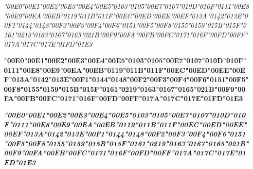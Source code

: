 {\itshape 
	\textsc{\char"00E0\gs \char"00E1\gs \char"00E2\gs \char"00E3\gs \char"00E4\gs \char"00E5\gs \char"0103\gs \char"0105\gs \char"00E7\gs \char"0107\gs \char"010D\gs \char"010F\gs \char"0111\gs \char"00E8\gs \char"00E9\gs \char"00EA\gs \char"00EB\gs \char"0119\gs \char"011B\gs \char"011F\gs \char"00EC\gs \char"00ED\gs \char"00EE\gs \char"00EF\gs \char"013A\gs \char"0142\gs \char"013E\gs \char"00F1\gs \char"0144\gs \char"0148\gs \char"00F2\gs \char"00F3\gs \char"00F4\gs \char"00F6\gs \char"0151\gs \char"00F5\gs \char"00F8\gs \char"0155\gs \char"0159\gs \char"015B\gs \char"015F\gs \char"0161\gs \char"0219\gs \char"0163\gs \char"0167\gs \char"0165\gs \char"021B\gs \char"00F9\gs \char"00FA\gs \char"00FB\gs \char"00FC\gs \char"0171\gs \char"016F\gs \char"00FD\gs \char"00FF\gs \char"017A\gs \char"017C\gs \char"017E\gs \char"01FD\gs \char"01E3\gs}
}

{\bfseries 
	\textsc{\char"00E0\gs \char"00E1\gs \char"00E2\gs \char"00E3\gs \char"00E4\gs \char"00E5\gs \char"0103\gs \char"0105\gs \char"00E7\gs \char"0107\gs \char"010D\gs \char"010F\gs \char"0111\gs \char"00E8\gs \char"00E9\gs \char"00EA\gs \char"00EB\gs \char"0119\gs \char"011B\gs \char"011F\gs \char"00EC\gs \char"00ED\gs \char"00EE\gs \char"00EF\gs \char"013A\gs \char"0142\gs \char"013E\gs \char"00F1\gs \char"0144\gs \char"0148\gs \char"00F2\gs \char"00F3\gs \char"00F4\gs \char"00F6\gs \char"0151\gs \char"00F5\gs \char"00F8\gs \char"0155\gs \char"0159\gs \char"015B\gs \char"015F\gs \char"0161\gs \char"0219\gs \char"0163\gs \char"0167\gs \char"0165\gs \char"021B\gs \char"00F9\gs \char"00FA\gs \char"00FB\gs \char"00FC\gs \char"0171\gs \char"016F\gs \char"00FD\gs \char"00FF\gs \char"017A\gs \char"017C\gs \char"017E\gs \char"01FD\gs \char"01E3\gs}
}

{\itshape\bfseries 
	\textsc{\char"00E0\gs \char"00E1\gs \char"00E2\gs \char"00E3\gs \char"00E4\gs \char"00E5\gs \char"0103\gs \char"0105\gs \char"00E7\gs \char"0107\gs \char"010D\gs \char"010F\gs \char"0111\gs \char"00E8\gs \char"00E9\gs \char"00EA\gs \char"00EB\gs \char"0119\gs \char"011B\gs \char"011F\gs \char"00EC\gs \char"00ED\gs \char"00EE\gs \char"00EF\gs \char"013A\gs \char"0142\gs \char"013E\gs \char"00F1\gs \char"0144\gs \char"0148\gs \char"00F2\gs \char"00F3\gs \char"00F4\gs \char"00F6\gs \char"0151\gs \char"00F5\gs \char"00F8\gs \char"0155\gs \char"0159\gs \char"015B\gs \char"015F\gs \char"0161\gs \char"0219\gs \char"0163\gs \char"0167\gs \char"0165\gs \char"021B\gs \char"00F9\gs \char"00FA\gs \char"00FB\gs \char"00FC\gs \char"0171\gs \char"016F\gs \char"00FD\gs \char"00FF\gs \char"017A\gs \char"017C\gs \char"017E\gs \char"01FD\gs \char"01E3\gs}
}
